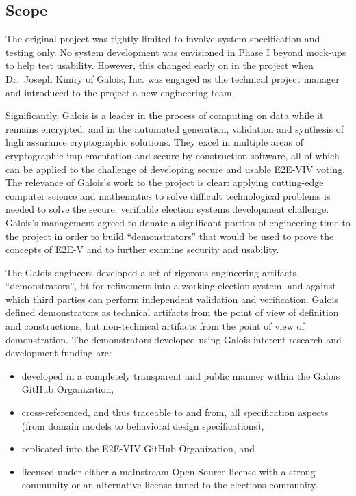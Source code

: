 \subsection{Scope}
\label{sec:scope}

The original project was tightly limited to involve system
specification and testing only. No system development was envisioned
in Phase I beyond mock-ups to help test usability. However, this
changed early on in the project when Dr.~Joseph Kiniry of Galois, Inc.
was engaged as the technical project manager and introduced to the project
a new engineering team. 

Significantly, Galois is a leader in the process of computing on data
while it remains encrypted, and in the automated generation,
validation and synthesis of high assurance cryptographic solutions.
They excel in multiple areas of cryptographic implementation and
secure-by-construction software, all of which can be applied to the
challenge of developing secure and usable E2E-VIV voting. The
relevance of Galois’s work to the project is clear: applying
cutting-edge computer science and mathematics to solve difficult
technological problems is needed to solve the secure, verifiable
election systems development challenge. Galois’s management agreed to
donate a significant portion of engineering time to the project in
order to build “demonstrators” that would be used to prove the
concepts of E2E-V and to further examine security and usability.

The Galois engineers developed a set of rigorous engineering
artifacts, ``demonstrators'', fit for refinement into a working
election system, and against which third parties can perform
independent validation and verification. Galois defined demonstrators
as technical artifacts from the point of view of definition and
constructions, but non-technical artifacts from the point of view of
demonstration. The demonstrators developed using Galois interent
research and development funding are:
\begin{itemize}
\item developed in a completely transparent and public manner within
  the Galois GitHub Organization,
\item cross-referenced, and thus traceable to and from, all
  specification aspects (from domain models to behavioral design
  specifications),
\item replicated into the E2E-VIV GitHub Organization, and
\item licensed under either a mainstream Open Source license with a
  strong community or an alternative license tuned to the elections
  community.
\end{itemize}

